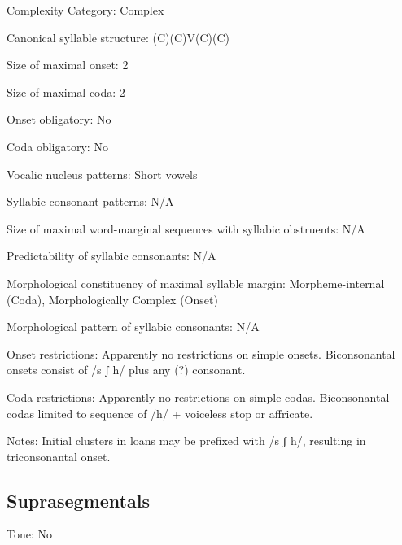 {\begin{appendixdesc}
\item[Complexity Category:] Complex

\item[Canonical syllable structure:] (C)(C)V(C)(C) \citep[9--15]{Kaufman1971}

\item[Size of maximal onset:] 2

\item[Size of maximal coda:] 2

\item[Onset obligatory:] No

\item[Coda obligatory:] No

\item[Vocalic nucleus patterns:] Short vowels

\item[Syllabic consonant patterns:] N/A

\item[Size of maximal word-marginal sequences with syllabic obstruents:] N/A

\item[Predictability of syllabic consonants:] N/A

\item[Morphological constituency of maximal syllable margin:] Morpheme-internal (Coda), Morphologically Complex (Onset)

\item[Morphological pattern of syllabic consonants:] N/A

\item[Onset restrictions:] Apparently no restrictions on simple onsets. Biconsonantal onsets consist of /s ʃ h/ plus any (?) consonant.

\item[Coda restrictions:] Apparently no restrictions on simple codas. Biconsonantal codas limited to sequence of /h/ + voiceless stop or affricate.

\item[Notes:] Initial clusters in  loans may be prefixed with /s ʃ h/, resulting in triconsonantal onset.
\end{appendixdesc}
\subsection*{Suprasegmentals}
\begin{appendixdesc}
\item[Tone:] No


\end{appendixdesc}}
